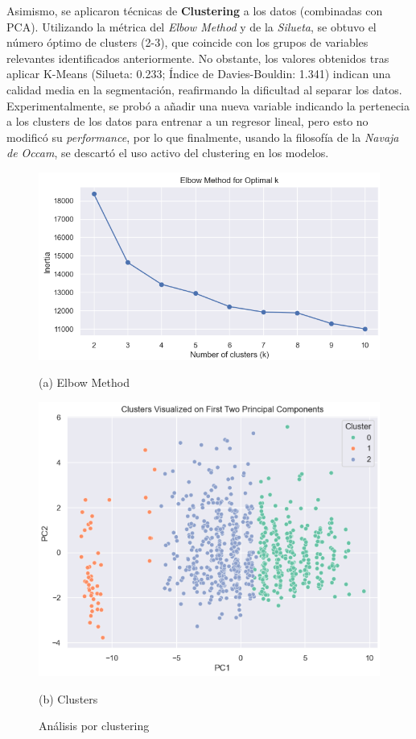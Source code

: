 \documentclass{article}
\begin{document}
Asimismo, se aplicaron técnicas de \textbf{Clustering} a los datos (combinadas con PCA). Utilizando la métrica del \textit{Elbow Method} y de la \textit{Silueta}, se obtuvo el número óptimo de clusters (2-3), que coincide con los grupos de variables relevantes identificados anteriormente. No obstante, los valores obtenidos tras aplicar K-Means (Silueta: 0.233; Índice de Davies-Bouldin: 1.341) indican una calidad media en la segmentación, reafirmando la dificultad al separar los datos. 
Experimentalmente, se probó a añadir una nueva variable indicando la pertenecia a los clusters de los datos para entrenar a un regresor lineal, pero esto no modificó su \textit{performance}, por lo que finalmente, usando la filosofía de la \textit{Navaja de Occam},
se descartó el uso activo del clustering en los modelos.

\begin{figure}[h!]
  \centering
  \begin{minipage}[b]{0.45\textwidth}
      \centering
      \includegraphics[scale=0.40]{Elbow_Method.png}
      \caption*{(a) Elbow Method}
  \end{minipage}
  \hfill
  \begin{minipage}[b]{0.45\textwidth}
      \centering
      \includegraphics[scale=0.4]{Clusters.png}
      \caption*{(b) Clusters}
  \end{minipage}
  \caption{Análisis por clustering}
\end{figure}
\end{document}
